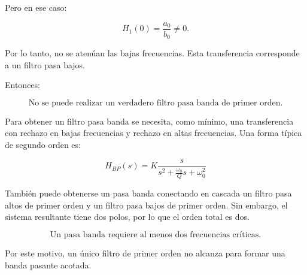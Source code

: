 Pero en ese caso:

\begin{equation}
    H_1(0)=\frac{a_0}{b_0}\neq0.
\end{equation}

Por lo tanto, no se atenúan las bajas frecuencias. Esta transferencia corresponde a un filtro pasa bajos.

Entonces:

\begin{equation}
    \boxed{
    \text{No se puede realizar un verdadero filtro pasa banda de primer orden.}
    }
\end{equation}

Para obtener un filtro pasa banda se necesita, como mínimo, una transferencia con rechazo en bajas frecuencias y rechazo en altas frecuencias. Una forma típica de segundo orden es:

\begin{equation}
    \boxed{
    H_{BP}(s)=
    K
    \frac{s}
    {s^2+\frac{\omega_0}{Q}s+\omega_0^2}
    }
\end{equation}

También puede obtenerse un pasa banda conectando en cascada un filtro pasa altos de primer orden y un filtro pasa bajos de primer orden. Sin embargo, el sistema resultante tiene dos polos, por lo que el orden total es dos.

\begin{equation}
    \boxed{
    \text{Un pasa banda requiere al menos dos frecuencias críticas.}
    }
\end{equation}

Por este motivo, un único filtro de primer orden no alcanza para formar una banda pasante acotada.